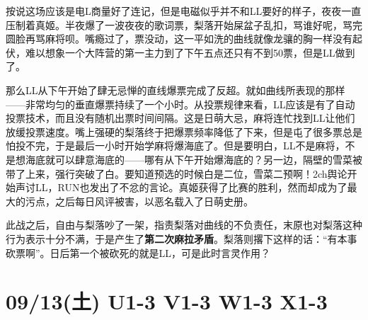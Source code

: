 按说这场应该是电L商量好了连记，但是电磁似乎并不和LL要好的样子，夜夜一直压制着真姬。半夜爆了一波夜夜的歌词票，梨落开始屎盆子乱扣，骂谁好呢，骂完圆脸再骂麻将呗。嘴瘾过了，票没动，这一平如洗的曲线就像龙骧的胸一样没有起伏，难以想象一个大阵营的第一主力到了下午五点还只有不到50票，但是LL做到了。

那么LL从下午开始了肆无忌惮的直线爆票完成了反超。就如曲线所表现的那样——非常均匀的垂直爆票持续了一个小时。从投票规律来看，LL应该是有了自动投票技术，而且没有随机出票时间间隔。这是日萌大忌，麻将连忙找到LL让他们放缓投票速度。嘴上强硬的梨落终于把爆票频率降低了下来，但是屯了很多票总是怕投不完，于是最后一小时开始学麻将爆海底了。但是要明白，LL不是麻将，不是想海底就可以肆意海底的——哪有从下午开始爆海底的？另一边，隔壁的雪菜被带了上来，强行突破了白。要知道预选的时候白是二位，雪菜二预啊！2ch舆论开始声讨LL，RUN也发出了不忿的言论。真姬获得了比赛的胜利，然而却成为了最大的污点，之后每日风评被害，以恶名载入了日萌史册。

此战之后，自由与梨落吵了一架，指责梨落对曲线的不负责任，末原也对梨落这种行为表示十分不满，于是产生了\textbf{第二次麻拉矛盾}。梨落则撂下这样的话：“有本事砍票啊”。日后第一个被砍死的就是LL，可是此时言灵作用？

\section{09/13(土) U1-3 V1-3 W1-3 X1-3}


